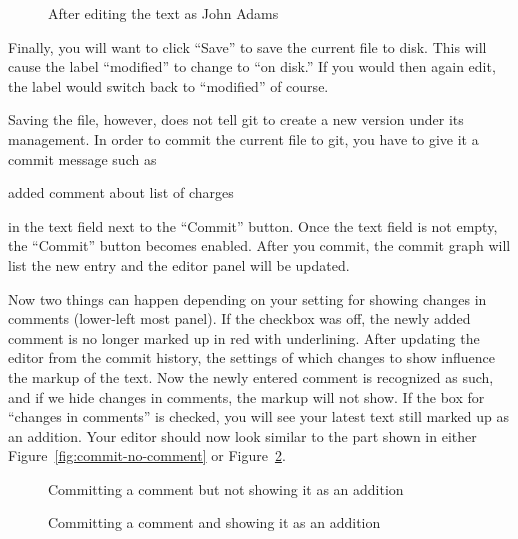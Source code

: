 \begin{figure}[t]
\centering
{}
\caption{After editing the text as John Adams} \label{fig:editor-modified}
\end{figure}

Finally, you will want to click ``Save'' to save the current file to disk.  This will cause the label ``modified'' to change to ``on disk.''  If you would then again edit, the label would switch back to ``modified'' of course.

Saving the file, however, does not tell git to create a new version under its management.  In order to commit the current file to git, you have to give it a commit message such as 
\begin{FileVerbatim}
added comment about list of charges
\end{FileVerbatim}
in the text field next to the ``Commit'' button.  Once the text field is not empty, the ``Commit'' button becomes enabled.  After you commit, the commit graph will list the new entry and the editor panel will be updated.  

Now two things can happen depending on your setting for showing changes in comments (lower-left most panel).  If the checkbox was off, the newly added comment is no longer marked up in red with underlining.  After updating the editor from the commit history, the settings of which changes to show influence the markup of the text.  Now the newly entered comment is recognized as such, and if we hide changes in comments, the markup will not show.  If the box for ``changes in comments'' is checked, you will see your latest text still marked up as an addition.  Your editor should now look similar to the part shown in either Figure~\ref{fig:commit-no-comment} or Figure~\ref{fig:commit-comment}.
\begin{figure}
\centering
  \begin{minipage}[t]{0.48\linewidth}
  \centering
  \caption{Committing a comment but not showing it as an addition} \label{fig:commit-no-comment}
  \end{minipage}%
\hspace{0.04\linewidth}%
  \begin{minipage}[t]{0.48\linewidth}
  \centering
  \caption{Committing a comment and showing it as an addition} \label{fig:commit-comment}
  \end{minipage}  
\end{figure}

